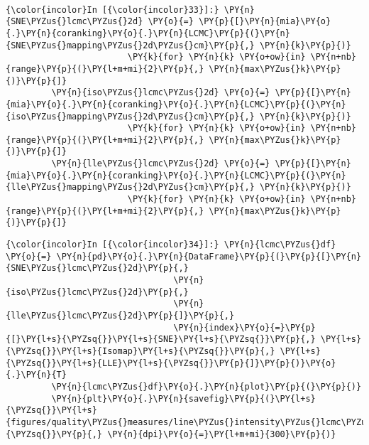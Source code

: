     \begin{center}
    \end{center}
    { \hspace*{\fill} \\}

    \begin{Verbatim}[commandchars=\\\{\}]
{\color{incolor}In [{\color{incolor}33}]:} \PY{n}{SNE\PYZus{}lcmc\PYZus{}2d} \PY{o}{=} \PY{p}{[}\PY{n}{mia}\PY{o}{.}\PY{n}{coranking}\PY{o}{.}\PY{n}{LCMC}\PY{p}{(}\PY{n}{SNE\PYZus{}mapping\PYZus{}2d\PYZus{}cm}\PY{p}{,} \PY{n}{k}\PY{p}{)}
                        \PY{k}{for} \PY{n}{k} \PY{o+ow}{in} \PY{n+nb}{range}\PY{p}{(}\PY{l+m+mi}{2}\PY{p}{,} \PY{n}{max\PYZus{}k}\PY{p}{)}\PY{p}{]}
         \PY{n}{iso\PYZus{}lcmc\PYZus{}2d} \PY{o}{=} \PY{p}{[}\PY{n}{mia}\PY{o}{.}\PY{n}{coranking}\PY{o}{.}\PY{n}{LCMC}\PY{p}{(}\PY{n}{iso\PYZus{}mapping\PYZus{}2d\PYZus{}cm}\PY{p}{,} \PY{n}{k}\PY{p}{)}
                        \PY{k}{for} \PY{n}{k} \PY{o+ow}{in} \PY{n+nb}{range}\PY{p}{(}\PY{l+m+mi}{2}\PY{p}{,} \PY{n}{max\PYZus{}k}\PY{p}{)}\PY{p}{]}
         \PY{n}{lle\PYZus{}lcmc\PYZus{}2d} \PY{o}{=} \PY{p}{[}\PY{n}{mia}\PY{o}{.}\PY{n}{coranking}\PY{o}{.}\PY{n}{LCMC}\PY{p}{(}\PY{n}{lle\PYZus{}mapping\PYZus{}2d\PYZus{}cm}\PY{p}{,} \PY{n}{k}\PY{p}{)}
                        \PY{k}{for} \PY{n}{k} \PY{o+ow}{in} \PY{n+nb}{range}\PY{p}{(}\PY{l+m+mi}{2}\PY{p}{,} \PY{n}{max\PYZus{}k}\PY{p}{)}\PY{p}{]}
\end{Verbatim}

    \begin{Verbatim}[commandchars=\\\{\}]
{\color{incolor}In [{\color{incolor}34}]:} \PY{n}{lcmc\PYZus{}df} \PY{o}{=} \PY{n}{pd}\PY{o}{.}\PY{n}{DataFrame}\PY{p}{(}\PY{p}{[}\PY{n}{SNE\PYZus{}lcmc\PYZus{}2d}\PY{p}{,}
                                 \PY{n}{iso\PYZus{}lcmc\PYZus{}2d}\PY{p}{,}
                                 \PY{n}{lle\PYZus{}lcmc\PYZus{}2d}\PY{p}{]}\PY{p}{,}
                                 \PY{n}{index}\PY{o}{=}\PY{p}{[}\PY{l+s}{\PYZsq{}}\PY{l+s}{SNE}\PY{l+s}{\PYZsq{}}\PY{p}{,} \PY{l+s}{\PYZsq{}}\PY{l+s}{Isomap}\PY{l+s}{\PYZsq{}}\PY{p}{,} \PY{l+s}{\PYZsq{}}\PY{l+s}{LLE}\PY{l+s}{\PYZsq{}}\PY{p}{]}\PY{p}{)}\PY{o}{.}\PY{n}{T}
         \PY{n}{lcmc\PYZus{}df}\PY{o}{.}\PY{n}{plot}\PY{p}{(}\PY{p}{)}
         \PY{n}{plt}\PY{o}{.}\PY{n}{savefig}\PY{p}{(}\PY{l+s}{\PYZsq{}}\PY{l+s}{figures/quality\PYZus{}measures/line\PYZus{}intensity\PYZus{}lcmc\PYZus{}2d.png}\PY{l+s}{\PYZsq{}}\PY{p}{,} \PY{n}{dpi}\PY{o}{=}\PY{l+m+mi}{300}\PY{p}{)}
\end{Verbatim}

